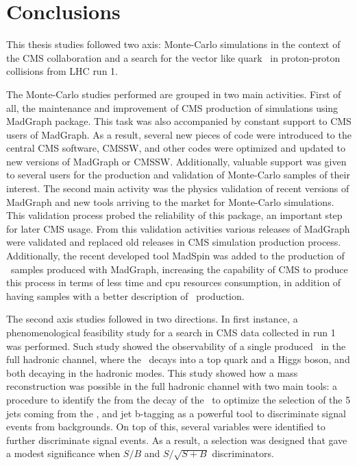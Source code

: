 \chapter*{Conclusions}

This thesis studies followed two axis: Monte-Carlo simulations in the context of the CMS collaboration and a search for the vector like quark \Tp~in proton-proton collisions from LHC run 1.

The Monte-Carlo studies performed are grouped in two main activities. First of all, the maintenance and improvement of CMS production of simulations using MadGraph package. This task was also accompanied by constant support to CMS users of MadGraph. As a result, several new pieces of code were introduced to the central CMS software, CMSSW, and other codes were optimized and updated to new versions of MadGraph or CMSSW. Additionally, valuable support was given to several users for the production and validation of Monte-Carlo samples of their interest. The second main activity was the physics validation of recent versions of MadGraph and new tools arriving to the market for Monte-Carlo simulations. This validation process probed the reliability of this package, an important step for later CMS usage. From this validation activities various releases of MadGraph were validated and replaced old releases in CMS simulation production process. Additionally, the recent developed tool MadSpin was added to the production of \ttbar~samples produced with MadGraph, increasing the capability of CMS to produce this process in terms of less time and cpu resources consumption, in addition of having samples with a better description of \ttbar~production.

The second axis studies followed in two directions. In first instance, a phenomenological feasibility study for a search in CMS data collected in run 1 was performed. Such study showed the observability of a single produced \Tp~in the full hadronic channel, where the \Tp~decays into a top quark and a Higgs boson, and both decaying in the hadronic modes. This study showed how a mass reconstruction was possible in the full hadronic channel with two main tools: a procedure to identify the from the decay of the \Tp~to optimize the selection of the 5 jets coming from the \Tp, and jet b-tagging as a powerful tool to discriminate signal events from backgrounds. On top of this, several variables were identified to further discriminate signal events. As a result, a selection was designed that gave a modest significance when $S/B$ and $S/\sqrt{S+B}$ discriminators.

